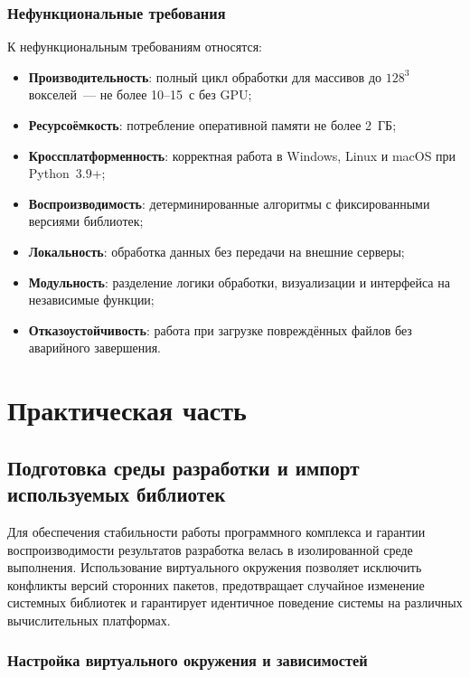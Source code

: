 \documentclass[14pt,a4paper]{extreport}
\begin{document}
\subsection{Нефункциональные требования}

К нефункциональным требованиям относятся:
\begin{itemize}
  \item \textbf{Производительность}: полный цикл обработки для массивов до $128^3$ вокселей~--- не более 10--15~с без GPU;
  \item \textbf{Ресурсоёмкость}: потребление оперативной памяти не более 2~ГБ;
  \item \textbf{Кроссплатформенность}: корректная работа в Windows, Linux и macOS при Python~3.9+;
  \item \textbf{Воспроизводимость}: детерминированные алгоритмы с фиксированными версиями библиотек;
  \item \textbf{Локальность}: обработка данных без передачи на внешние серверы;
  \item \textbf{Модульность}: разделение логики обработки, визуализации и интерфейса на независимые функции;
  \item \textbf{Отказоустойчивость}: работа при загрузке повреждённых файлов без аварийного завершения.
\end{itemize}

\newpage

\chapter{Практическая часть}

\section{Подготовка среды разработки и импорт используемых библиотек}

Для обеспечения стабильности работы программного комплекса и гарантии воспроизводимости результатов разработка велась в изолированной среде выполнения. Использование виртуального окружения позволяет исключить конфликты версий сторонних пакетов, предотвращает случайное изменение системных библиотек и гарантирует идентичное поведение системы на различных вычислительных платформах.

\subsection{Настройка виртуального окружения и зависимостей}
\end{document}
